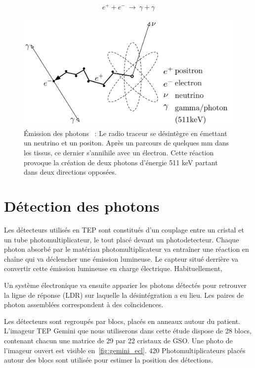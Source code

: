 \begin{equation}
 e^+ + e^-~\rightarrow~\gamma + \gamma
\label{eq:annihilation}
\end{equation}

\begin{figure}
\centering
\includegraphics[width=12cm]{images/annihilation}
\caption[\'Emission des photons]{\'Emission des photons~\cite{Langner2008ad} : Le radio traceur se désintègre en émettant un neutrino et un positon. Après un parcours de quelques mm dans les tissus, ce dernier s'annihile avec un électron. Cette réaction provoque la création de deux photons d'énergie 511 keV partant dans deux directions opposées.}
\label{fig:Langner2008ad}
\end{figure}

\section{Détection des photons}

Les détecteurs utilisés en TEP sont constitués d'un couplage entre un cristal et un tube photomultiplicateur, le tout placé devant un photodetecteur. Chaque photon absorbé par le matériau photomultiplicateur va entraîner une réaction en chaîne qui va déclencher une émission lumineuse. Le capteur situé derrière va convertir cette émission lumineuse en charge électrique. Habituellement,  

Un système électronique va ensuite apparier les photons détectés pour retrouver la ligne de réponse (LDR) sur laquelle la désintégration a eu lieu. Les paires de photon assemblées correspondent à des coïncidences.

Les détecteurs sont regroupés par blocs, placés en anneaux autour du patient. L'imageur TEP Gemini que nous utiliserons dans cette étude dispose de 28 blocs, contenant chacun une matrice de 29 par 22 cristaux de GSO. Une photo de l'imageur ouvert est visible en~\ref{fig:gemini_ecl}. 420 Photomultiplicateurs placés autour des blocs sont utilisée pour estimer la position des détections.

